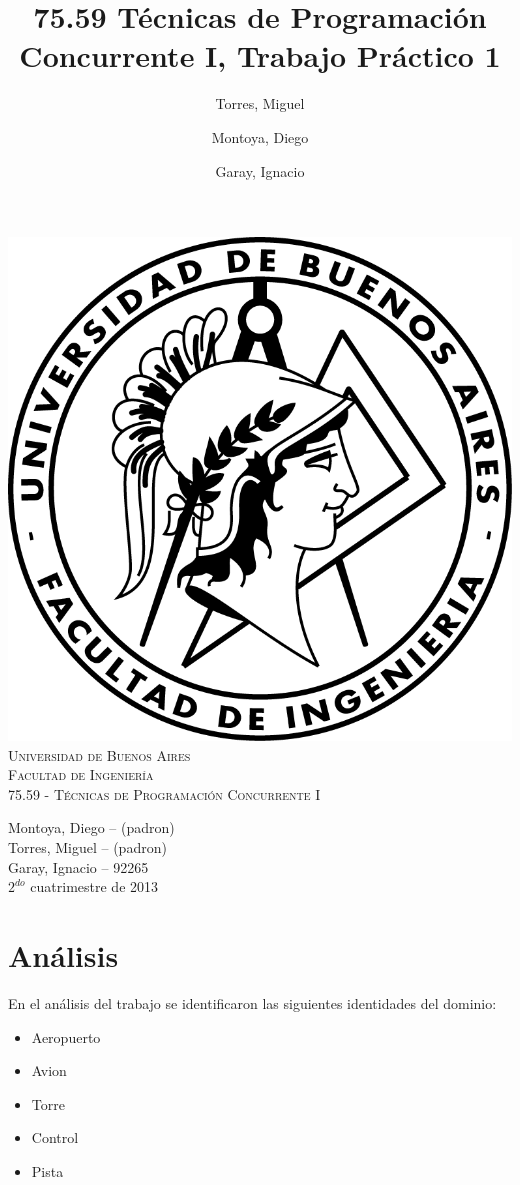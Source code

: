 \documentclass[a4paper,12pt,titlepage]{article}
\title{75.59 Técnicas de Programación Concurrente I, Trabajo Práctico 1}
\author{Torres, Miguel \and Montoya, Diego \and Garay, Ignacio}
\begin{document}
\thispagestyle{empty}
\begin{center}
\includegraphics{./logo-fiuba.png}\\
\vspace{1cm}
\textsc{\LARGE Universidad de Buenos Aires}\\[0.3cm]
\textsc{\LARGE Facultad de Ingenier\'ia}\\[1.2cm]
\textsc{\Large 75.59 - Técnicas de Programación Concurrente I}\\[0.3cm]
\end{center}

\begin{flushright}
{\large
Montoya, Diego -- (padron)\\
Torres, Miguel -- (padron)\\
Garay, Ignacio -- 92265\\
\vspace{2cm}
$2^{do}$ cuatrimestre de 2013}
\end{flushright}

\pagestyle{fancy}
\setcounter{page}{1}
\newpage

\tableofcontents
\newpage

\footnotesize
\section{Análisis}
En el análisis del trabajo se identificaron las siguientes identidades del dominio:\\
\begin{itemize}
\item Aeropuerto
\item Avion
\item Torre
\item Control
\item Pista
\end{itemize}
\end{document}
